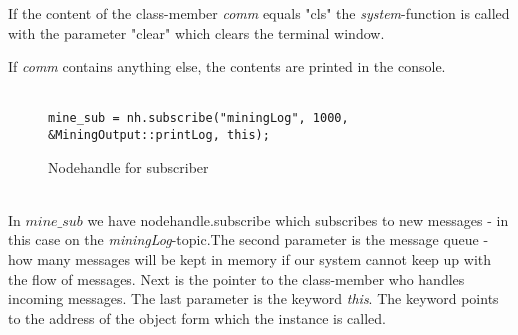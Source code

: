 If the content of the class-member \textit{comm} equals "cls" the \textit{system}-function is called with the parameter "clear" which clears the terminal window.

If \textit{comm} contains anything else, the contents are printed in the console.\\
\\
\begin{figure}[!ht]
\begin{lstlisting}
mine_sub = nh.subscribe("miningLog", 1000, &MiningOutput::printLog, this);
\end{lstlisting}
\vspace{-10mm}
\caption{Nodehandle for subscriber}
\end{figure}
\\
In $mine\_sub$ we have nodehandle.subscribe which subscribes to new messages - in this case on the \textit{miningLog}-topic.The second parameter is the message queue - how many messages will be kept in memory if our system cannot keep up with the flow of messages. Next is the pointer to the class-member who handles incoming messages. The last parameter is the keyword \textit{this}. The keyword points to the address of the object form which the instance is called.